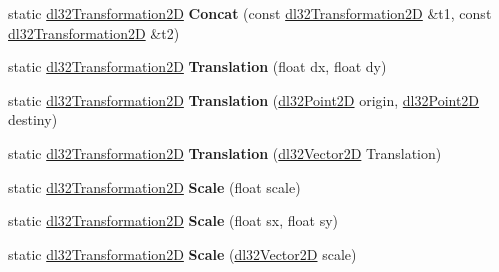 \begin{DoxyCompactItemize}
\item 
\hypertarget{classdl32_transformation2_d_a52fa4b4e36436f9dff2a9f47e60ac4cb}{static \hyperlink{classdl32_transformation2_d}{dl32\-Transformation2\-D} {\bfseries Concat} (const \hyperlink{classdl32_transformation2_d}{dl32\-Transformation2\-D} \&t1, const \hyperlink{classdl32_transformation2_d}{dl32\-Transformation2\-D} \&t2)}\label{classdl32_transformation2_d_a52fa4b4e36436f9dff2a9f47e60ac4cb}

\item 
\hypertarget{classdl32_transformation2_d_ab5e54b47e1234f9205ed399d01781ad3}{static \hyperlink{classdl32_transformation2_d}{dl32\-Transformation2\-D} {\bfseries Translation} (float dx, float dy)}\label{classdl32_transformation2_d_ab5e54b47e1234f9205ed399d01781ad3}

\item 
\hypertarget{classdl32_transformation2_d_aaa5d4a3ba85d2aaf98fcf10dd7170e4f}{static \hyperlink{classdl32_transformation2_d}{dl32\-Transformation2\-D} {\bfseries Translation} (\hyperlink{structdl32_point2_d}{dl32\-Point2\-D} origin, \hyperlink{structdl32_point2_d}{dl32\-Point2\-D} destiny)}\label{classdl32_transformation2_d_aaa5d4a3ba85d2aaf98fcf10dd7170e4f}

\item 
\hypertarget{classdl32_transformation2_d_a0adb1f1aa26698165fc8113bfcd4630c}{static \hyperlink{classdl32_transformation2_d}{dl32\-Transformation2\-D} {\bfseries Translation} (\hyperlink{structdl32_vector2_d}{dl32\-Vector2\-D} Translation)}\label{classdl32_transformation2_d_a0adb1f1aa26698165fc8113bfcd4630c}

\item 
\hypertarget{classdl32_transformation2_d_af3609a9f81eda58c22b4953dafaf93fd}{static \hyperlink{classdl32_transformation2_d}{dl32\-Transformation2\-D} {\bfseries Scale} (float scale)}\label{classdl32_transformation2_d_af3609a9f81eda58c22b4953dafaf93fd}

\item 
\hypertarget{classdl32_transformation2_d_aca6eccca7c75097c0faf50ffcf26c6ad}{static \hyperlink{classdl32_transformation2_d}{dl32\-Transformation2\-D} {\bfseries Scale} (float sx, float sy)}\label{classdl32_transformation2_d_aca6eccca7c75097c0faf50ffcf26c6ad}

\item 
\hypertarget{classdl32_transformation2_d_a57bc1bb4dddabceb971fb145b548bf72}{static \hyperlink{classdl32_transformation2_d}{dl32\-Transformation2\-D} {\bfseries Scale} (\hyperlink{structdl32_vector2_d}{dl32\-Vector2\-D} scale)}\label{classdl32_transformation2_d_a57bc1bb4dddabceb971fb145b548bf72}


\end{DoxyCompactItemize}

